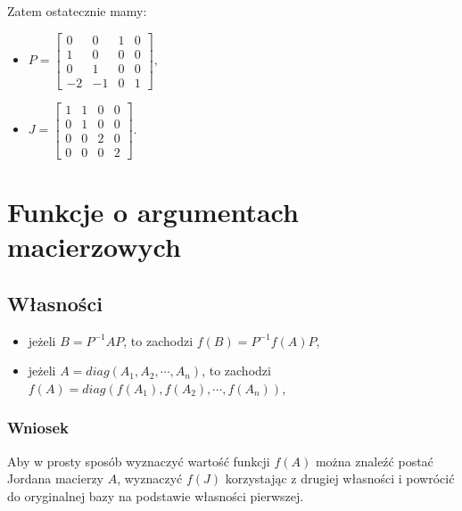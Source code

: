 \documentclass{article}
\begin{document}
Zatem ostatecznie mamy:
\begin{itemize}
    \item 
    $
        P
        =
        \begin{bmatrix}
            0 & 0 & 1 & 0\\
            1 & 0 & 0 & 0\\
            0 & 1 & 0 & 0\\
           -2 &-1 & 0 & 1
        \end{bmatrix},
    $
    \item 
    $
        J
        =
        \begin{bmatrix}
            1 & 1 & 0 & 0\\
            0 & 1 & 0 & 0\\
            0 & 0 & 2 & 0\\
            0 & 0 & 0 & 2
        \end{bmatrix}.
    $
\end{itemize}

\section{Funkcje o argumentach macierzowych}
\subsection{Własności}
\begin{itemize}
    \item jeżeli $B = P^{-1}AP$, to zachodzi $f(B) = P^{-1}f(A)P$,
    \item jeżeli $A = diag(A_{1}, A_{2}, \cdots, A_{n})$, to zachodzi $f(A) = diag(f(A_{1}), f(A_{2}), \cdots, f(A_{n}))$,
\end{itemize}

\subsubsection{Wniosek}
Aby w prosty sposób wyznaczyć wartość funkcji $f(A)$ można znaleźć postać Jordana macierzy $A$, wyznaczyć $f(J)$ korzystając z drugiej własności i powrócić do oryginalnej bazy na podstawie własności pierwszej.

\end{document}
